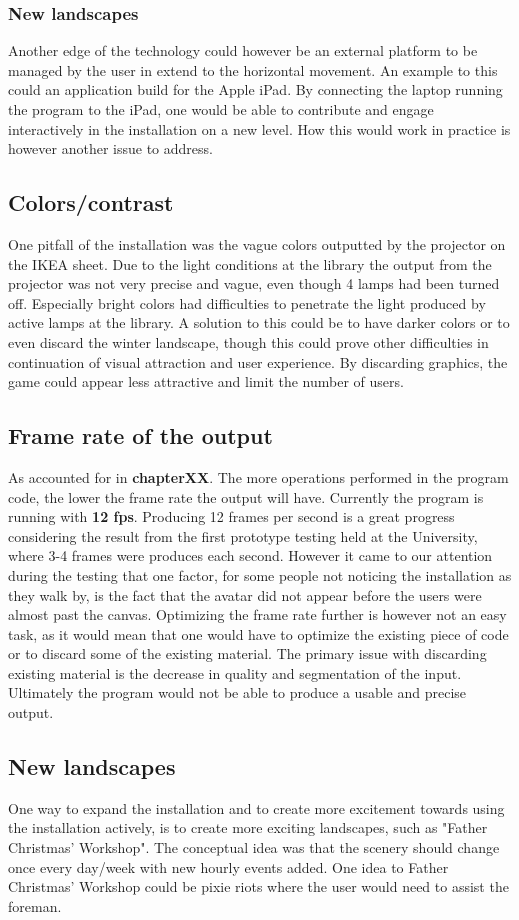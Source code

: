 \subsubsection{New landscapes}  
Another edge of the technology could however be an external platform to be managed by the user in extend to the horizontal movement. An example to this could an application build for the Apple iPad. By connecting the laptop running the program to the iPad, one would be able to contribute and engage interactively in the installation on a new level. How this would work in practice is however another issue to address. 
\subsection{Colors/contrast}
One pitfall of the installation was the vague colors outputted by the projector on the IKEA sheet. Due to the light conditions at the library the output from the projector was not very precise and vague, even though 4 lamps had been turned off. Especially bright colors had difficulties to penetrate the light produced by active lamps at the library. A solution to this could be to have darker colors or to even discard the winter landscape, though this could prove other difficulties in continuation of visual attraction and user experience. By discarding graphics, the game could appear less attractive and limit the number of users.
 
\subsection{Frame rate of the output}
As accounted for in \textbf{chapterXX}. The more operations performed in the program code, the lower the frame rate the output will have. Currently the program is running with \textbf{12 fps}. Producing 12 frames per second is a great progress considering the result from the first prototype testing held at the University, where 3-4 frames were produces each second. However it came to our attention during the testing that one factor, for some people not noticing the installation as they walk by, is the fact that the avatar did not appear before the users were almost past the canvas. Optimizing the frame rate further is however not an easy task, as it would mean that one would have to optimize the existing piece of code or to discard some of the existing material. The primary issue with discarding existing material is the decrease in quality and segmentation of the input. Ultimately the program would not be able to produce a usable and precise output.   
\subsection{New landscapes}
One way to expand the installation and to create more excitement towards using the installation actively, is to create more exciting landscapes, such as "Father Christmas' Workshop". The conceptual idea was that the scenery should change once every day/week with new hourly events added. One idea to Father Christmas' Workshop could be pixie riots where the user would need to assist the foreman.

